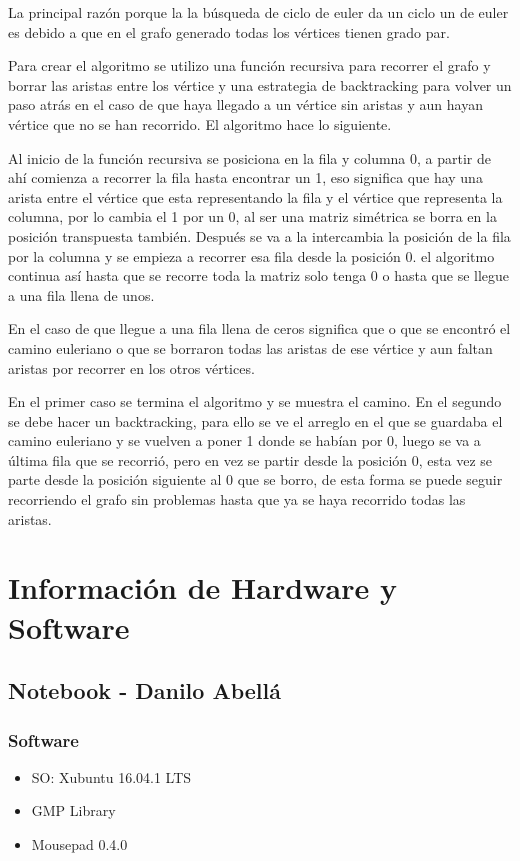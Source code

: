 \documentclass[12pt,letterpaper]{scrartcl}
\begin{document}
La principal razón porque la la búsqueda de ciclo de euler da un ciclo un de euler es debido a que en el grafo generado todas los vértices tienen grado par.

Para crear el algoritmo se utilizo una función recursiva para recorrer el grafo y borrar las aristas entre los vértice y una estrategia de backtracking para volver un paso atrás en el caso de que haya llegado a un vértice sin aristas y aun hayan vértice que no se han recorrido. El algoritmo hace lo siguiente.

Al inicio de la función recursiva se posiciona en la fila y columna 0, a partir de ahí comienza a recorrer la fila hasta encontrar un 1, eso significa que hay una arista entre el vértice que esta representando la fila y el vértice que representa la columna, por lo cambia el 1 por un 0, al ser una matriz simétrica se borra en la posición transpuesta también. Después se va a la intercambia la posición de la fila por la columna y se empieza a recorrer esa fila desde la posición 0. el algoritmo continua así hasta que se recorre toda la matriz solo tenga 0 o hasta que se llegue a una fila llena de unos.

En el caso de que llegue a una fila llena de ceros significa que o que se encontró el camino euleriano o que se borraron todas las aristas de ese vértice y aun faltan aristas por recorrer en los otros vértices.

En el primer caso se termina el algoritmo y se muestra el camino. En el segundo se debe hacer un backtracking, para ello se ve el arreglo en el que se guardaba el camino euleriano y se vuelven a poner 1 donde se habían por 0, luego se va a última fila que se recorrió, pero en vez se partir desde la posición 0, esta vez se parte desde la posición siguiente al 0 que se borro, de esta forma se puede seguir recorriendo el grafo sin problemas hasta que ya se haya recorrido todas las aristas.






\section{Información de Hardware y Software}

\subsection{ Notebook - Danilo Abellá}
\subsubsection{Software}
\begin{itemize}
	\item SO: Xubuntu 16.04.1 LTS
	\item GMP Library
	\item Mousepad 0.4.0
\end{itemize}
\end{document}

